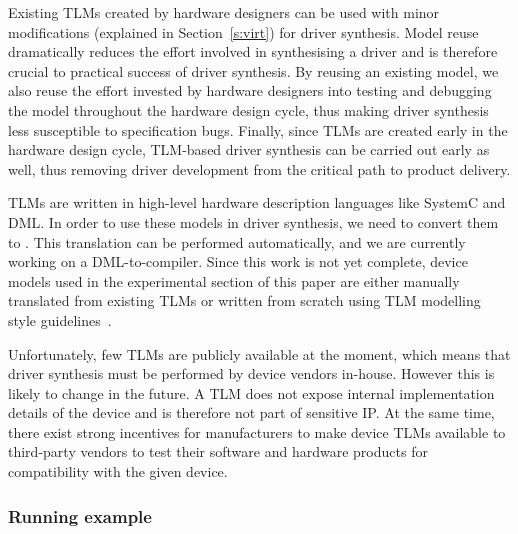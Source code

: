 Existing TLMs created by hardware designers can be used with minor modifications (explained in Section~\ref{s:virt}) for driver synthesis.  Model reuse dramatically reduces the effort involved in synthesising a driver and is therefore crucial to practical success of driver synthesis.  By reusing an existing model, we also reuse the effort invested by hardware designers into testing and debugging the model throughout the hardware design cycle, thus making driver synthesis less susceptible to specification bugs.  Finally, since TLMs are created early in the hardware design cycle, TLM-based driver synthesis can be carried out early as well, thus removing driver development from the critical path to product delivery.

TLMs are written in high-level hardware description languages like SystemC and DML\@.  In order to use these models in driver synthesis, we need to convert them to \tsl.  This translation can be performed automatically, and we are currently working on a DML-to-\tsl compiler.  Since this work is not yet complete, device models used in the experimental section of this paper are either manually translated from existing TLMs or written from scratch using TLM modelling style guidelines~\cite{dml_ug}.

Unfortunately, few TLMs are publicly available at the moment, which means that driver synthesis must be performed by  device vendors in-house.  However this is likely to change in the future.  A TLM does not expose internal implementation details of the device and is therefore not part of sensitive IP\@.  At the same time, there exist strong incentives for manufacturers to make device TLMs available to third-party vendors to test their software and hardware products for compatibility with the given device.

\subsubsection{Running example}

